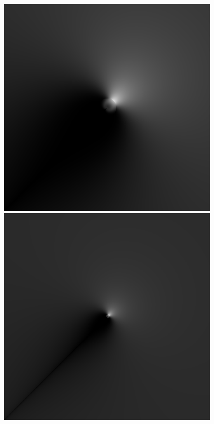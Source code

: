 \begin{figure}
{ \includegraphics[scale=0.115]{figures/dfilt_wur_sqrt2.png}
 }
 \hfill
 \subtop
 {
 \includegraphics[scale=0.115]{figures/dfilt_wur_sqrt8.png}
 }
 \hfill
 \subtop
 {
}
\end{figure}
